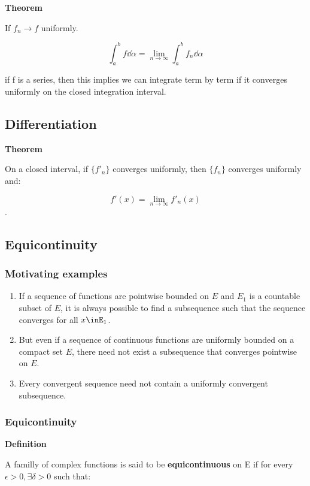 \documentclass[11pt]{article}
\begin{document}
\textbf{Theorem}

If \(f_n \to f\) uniformly.

\[
\int_a^b f \dd{\alpha} = \lim_{n\to\infty}\int_a^b f_n \dd{\alpha}
\]

if f is a series, then this implies we can integrate term by term if it converges uniformly on the closed integration interval.

\subsection{Differentiation}
\label{sec:org0824722}

\textbf{Theorem}

On a closed interval, if \(\{f'_n\}\) converges uniformly, then \(\{f_n\}\) converges uniformly and:

\[
f'(x) = \lim_{n\to\infty}f'_n(x)
\].

\subsection{Equicontinuity}
\label{sec:org528b2c6}


\subsubsection{Motivating examples}
\label{sec:org9b0f48d}

\begin{enumerate}
\item If a sequence of functions are pointwise bounded on \(E\) and \(E_1\) is a countable subset of \(E\), it is always possible to find a subsequence such that the sequence converges for all \(x\inE_1\).
\item But even if a sequence of continuous functions are uniformly bounded on a compact set \(E\), there need not exist a subsequence that converges pointwise on \(E\).
\item Every convergent sequence need not contain a uniformly convergent subsequence.
\end{enumerate}


\subsubsection{Equicontinuity}
\label{sec:orgc88fde2}

\textbf{Definition}

A familly of complex functions is said to be \textbf{equicontinuous} on E if for every \(\epsilon > 0, \exists \delta > 0\) such that:
\end{document}
